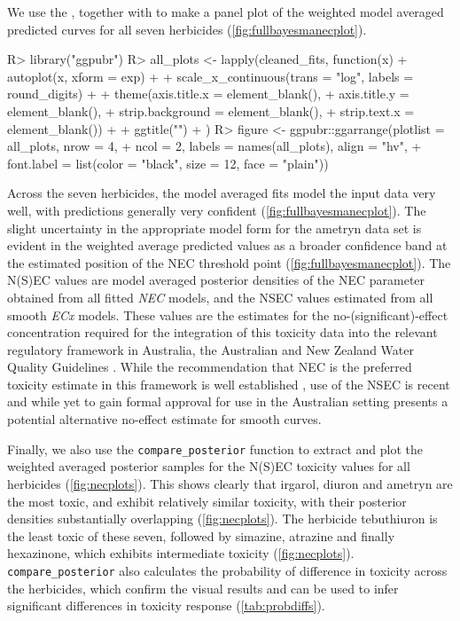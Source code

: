 \documentclass[
  shortnames]{jss}
\begin{document}
We use the  , together with  \citep{ggpubr} to make a panel plot of the weighted model averaged predicted curves for all seven herbicides (\autoref{fig:fullbayesmanecplot}).

\begin{CodeChunk}
\begin{CodeInput}
R> library("ggpubr")
R> all_plots <- lapply(cleaned_fits, function(x) {
+   autoplot(x, xform = exp) +
+     scale_x_continuous(trans = "log", labels = round_digits) +
+     theme(axis.title.x = element_blank(),
+           axis.title.y = element_blank(),
+           strip.background = element_blank(),
+           strip.text.x = element_blank()) +
+     ggtitle("")
+ })
R> figure <- ggpubr::ggarrange(plotlist = all_plots, nrow = 4,
+   ncol = 2, labels = names(all_plots), align = "hv",
+   font.label = list(color = "black", size = 12, face = "plain"))
\end{CodeInput}
\end{CodeChunk}

Across the seven herbicides, the  model averaged fits model the input data very well, with predictions generally very confident (\autoref{fig:fullbayesmanecplot}). The slight uncertainty in the appropriate model form for the ametryn data set is evident in the weighted average predicted values as a broader confidence band at the estimated position of the NEC threshold point (\autoref{fig:fullbayesmanecplot}). The N(S)EC values are model averaged posterior densities of the NEC parameter obtained from all fitted \emph{NEC} models, and the NSEC values estimated from all smooth \emph{ECx} models. These values are the  estimates for the no-(significant)-effect concentration required for the integration of this toxicity data into the relevant regulatory framework in Australia, the Australian and New Zealand Water Quality Guidelines \citep{anzg}. While the recommendation that NEC is the preferred toxicity estimate in this framework is well established \citep{Warne2015, Warne2018c}, use of the NSEC is recent \citep{Fisher2023} and while yet to gain formal approval for use in the Australian setting presents a potential alternative no-effect estimate for smooth curves.

Finally, we also use the \texttt{compare\_posterior} function to extract and plot the weighted averaged posterior samples for the N(S)EC toxicity values for all herbicides (\autoref{fig:necplots}). This shows clearly that irgarol, diuron and ametryn are the most toxic, and exhibit relatively similar toxicity, with their posterior densities substantially overlapping (\autoref{fig:necplots}). The herbicide tebuthiuron is the least toxic of these seven, followed by simazine, atrazine and finally hexazinone, which exhibits intermediate toxicity (\autoref{fig:necplots}). \texttt{compare\_posterior} also calculates the probability of difference in toxicity across the herbicides, which confirm the visual results and can be used to infer significant differences in toxicity response (\autoref{tab:probdiffs}).
\end{document}
